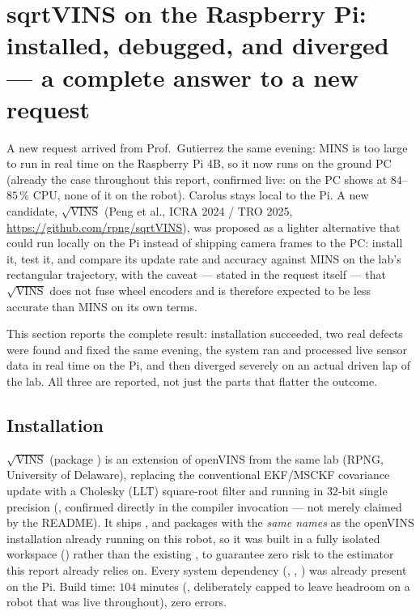 \section{sqrtVINS on the Raspberry Pi: installed, debugged, and diverged
--- a complete answer to a new request}
\label{sec:sqrtvins}

A new request arrived from Prof.\ Gutierrez the same evening: MINS is too
large to run in real time on the Raspberry Pi 4B, so it now runs on the
ground PC (already the case throughout this report, confirmed live:
 on the PC shows  at $84$--$85\,\%$
CPU, none of it on the robot). Carolus stays local to the Pi. A new
candidate, $\sqrt{\text{VINS}}$ (Peng et al., ICRA 2024 / TRO 2025,
\url{https://github.com/rpng/sqrtVINS}), was proposed as a lighter
alternative that could run locally on the Pi instead of shipping camera
frames to the PC: install it, test it, and compare its update rate and
accuracy against MINS on the lab's rectangular trajectory, with the
caveat --- stated in the request itself --- that $\sqrt{\text{VINS}}$
does not fuse wheel encoders and is therefore expected to be less
accurate than MINS on its own terms.

This section reports the complete result: installation succeeded, two
real defects were found and fixed the same evening, the system ran and
processed live sensor data in real time on the Pi, and then diverged
severely on an actual driven lap of the lab. All three are reported,
not just the parts that flatter the outcome.

\subsection{Installation}

$\sqrt{\text{VINS}}$ (package ) is an extension of
openVINS from the same lab (RPNG, University of Delaware), replacing the
conventional EKF/MSCKF covariance update with a Cholesky (LLT)
square-root filter and running in $32$-bit single precision
(, confirmed directly in the compiler invocation ---
not merely claimed by the README). It ships , 
and  packages with the \emph{same names} as the openVINS
installation already running on this robot, so it was built in a fully
isolated workspace () rather than the
existing , to guarantee zero risk to the estimator this
report already relies on. Every system dependency
(, , )
was already present on the Pi. Build time: $104$ minutes
(, deliberately capped to leave headroom on a
robot that was live throughout), zero errors.

